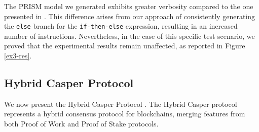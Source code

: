 The PRISM model we generated exhibits greater verbosity compared to the one presented in \cite{DBLP:journals/concurrency/BistarelliNGLMV23}. This difference arises from our approach of consistently generating the \texttt{else} branch for the \texttt{if-then-else} expression, resulting in an increased number of instructions.
Nevertheless, in the case of this specific test scenario, we proved that the experimental results remain unaffected, as reported in Figure \ref{ex3-res}.




\subsection{Hybrid Casper Protocol}
\begin{comment}
\begin{wrapfigure}[12]{l}{4.5cm}
	\texttt{[image: ethereum.pdf]}	
\end{wrapfigure} 
\end{comment}
We now present the Hybrid Casper Protocol \cite{DBLP:journals/distribledger/GallettaLMV23}. The Hybrid Casper protocol represents a hybrid consensus protocol for blockchains, merging features from both Proof of Work and Proof of Stake protocols. 

